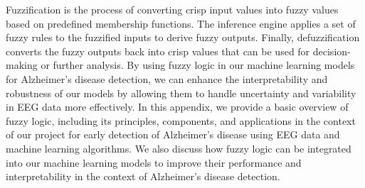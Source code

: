 \documentclass[openany]{book}
\begin{document}
Fuzzification is the process of converting crisp input values into fuzzy values based on predefined membership functions. The inference engine applies a set of fuzzy rules to the fuzzified inputs to derive fuzzy outputs. Finally, defuzzification converts the fuzzy outputs back into crisp values that can be used for decision-making or further analysis. By using fuzzy logic in our machine learning models for Alzheimer's disease detection, we can enhance the interpretability and robustness of our models by allowing them to handle uncertainty and variability in EEG data more effectively. In this appendix, we provide a basic overview of fuzzy logic, including its principles, components, and applications in the context of our project for early detection of Alzheimer's disease using EEG data and machine learning algorithms. We also discuss how fuzzy logic can be integrated into our machine learning models to improve their performance and interpretability in the context of Alzheimer's disease detection.
\end{document}
